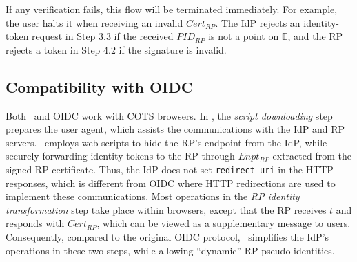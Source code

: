 If any verification fails, this flow will be terminated immediately.
For example, the user halts it when receiving an invalid $Cert_{RP}$.
The IdP rejects an identity-token request in Step 3.3 if the received $PID_{RP}$ is not a point on $\mathbb{E}$, and the RP rejects a token in Step 4.2 if the signature is invalid. 
%

\subsection{Compatibility with OIDC}
\label{subsec:compatible}

Both \usso\ and OIDC work with COTS browsers. %
In \usso, the \emph{script downloading} step prepares the user agent, which assists the communications with the IdP and RP servers. \usso\ employs web scripts to hide the RP's endpoint from the IdP, while securely forwarding identity tokens to the RP through $Enpt_{RP}$ extracted from the signed RP certificate.
Thus, the IdP does not set \verb+redirect_uri+ in the HTTP responses, which is different from OIDC where HTTP redirections are used to implement these communications. Most operations in the \emph{RP identity transformation} step take place within browsers,
except that the RP receives $t$ and responds with $Cert_{RP}$,
which can be viewed as a supplementary message to users.
Consequently, compared to the original OIDC protocol, \usso\ simplifies the IdP's operations in these two steps, while allowing ``dynamic'' RP pseudo-identities.

